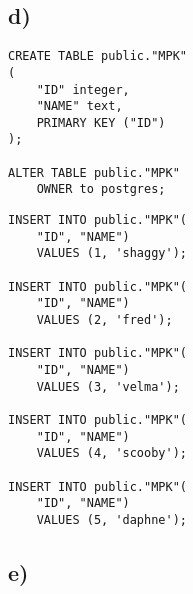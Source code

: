\documentclass[ngerman]{dis-template-add}
\begin{document}
\subsection*{d)}

\begin{verbatim}
CREATE TABLE public."MPK"
(
    "ID" integer,
    "NAME" text,
    PRIMARY KEY ("ID")
);

ALTER TABLE public."MPK"
    OWNER to postgres;
\end{verbatim}

\begin{verbatim}
INSERT INTO public."MPK"(
    "ID", "NAME")
    VALUES (1, 'shaggy');

INSERT INTO public."MPK"(
    "ID", "NAME")
    VALUES (2, 'fred');
	
INSERT INTO public."MPK"(
    "ID", "NAME")
    VALUES (3, 'velma');
	
INSERT INTO public."MPK"(
    "ID", "NAME")
    VALUES (4, 'scooby');
	
INSERT INTO public."MPK"(
    "ID", "NAME")
    VALUES (5, 'daphne');
\end{verbatim}


\subsection*{e)}
\end{document}
